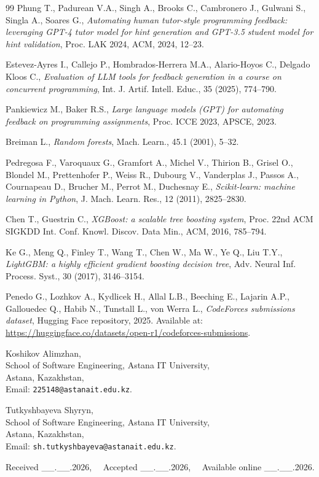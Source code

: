 \documentclass[twoside, 11pt]{article}
\begin{document}
\begin{thebibliography}{99}
 Phung T., Padurean V.A., Singh A., Brooks C., Cambronero J., Gulwani S., Singla A., Soares G., {\it Automating human tutor-style programming feedback: leveraging GPT-4 tutor model for hint generation and GPT-3.5 student model for hint validation}, Proc. LAK 2024, ACM, 2024, 12--23.

 Estevez-Ayres I., Callejo P., Hombrados-Herrera M.A., Alario-Hoyos C., Delgado Kloos C., {\it Evaluation of LLM tools for feedback generation in a course on concurrent programming}, Int. J. Artif. Intell. Educ., 35 (2025), 774--790.

 Pankiewicz M., Baker R.S., {\it Large language models (GPT) for automating feedback on programming assignments}, Proc. ICCE 2023, APSCE, 2023.

 Breiman L., {\it Random forests}, Mach. Learn., 45.1 (2001), 5--32.

 Pedregosa F., Varoquaux G., Gramfort A., Michel V., Thirion B., Grisel O., Blondel M., Prettenhofer P., Weiss R., Dubourg V., Vanderplas J., Passos A., Cournapeau D., Brucher M., Perrot M., Duchesnay E., {\it Scikit-learn: machine learning in Python}, J. Mach. Learn. Res., 12 (2011), 2825--2830.

 Chen T., Guestrin C., {\it XGBoost: a scalable tree boosting system}, Proc. 22nd ACM SIGKDD Int. Conf. Knowl. Discov. Data Min., ACM, 2016, 785--794.

 Ke G., Meng Q., Finley T., Wang T., Chen W., Ma W., Ye Q., Liu T.Y., {\it LightGBM: a highly efficient gradient boosting decision tree}, Adv. Neural Inf. Process. Syst., 30 (2017), 3146--3154.

 Penedo G., Lozhkov A., Kydlicek H., Allal L.B., Beeching E., Lajarin A.P., Gallouedec Q., Habib N., Tunstall L., von Werra L., {\it CodeForces submissions dataset}, Hugging Face repository, 2025. Available at: \url{https://huggingface.co/datasets/open-r1/codeforces-submissions}.

\end{thebibliography}

\footnotesize
\noindent
\parbox[t]{75mm}{
Koshikov Alimzhan,\\
School of Software Engineering, Astana IT University,\\
Astana, Kazakhstan,\\
Email: {\tt 225148@astanait.edu.kz}.}
\hfill
\parbox[t]{75mm}{
Tutkyshbayeva Shyryn,\\
School of Software Engineering, Astana IT University,\\
Astana, Kazakhstan,\\
Email: {\tt sh.tutkyshbayeva@astanait.edu.kz}.}

\vspace{3mm}
Received \_\_.\_\_.2026, $\> \> \> $ Accepted \_\_.\_\_.2026, $\> \> \> $ Available online \_\_.\_\_.2026.
\end{document}
